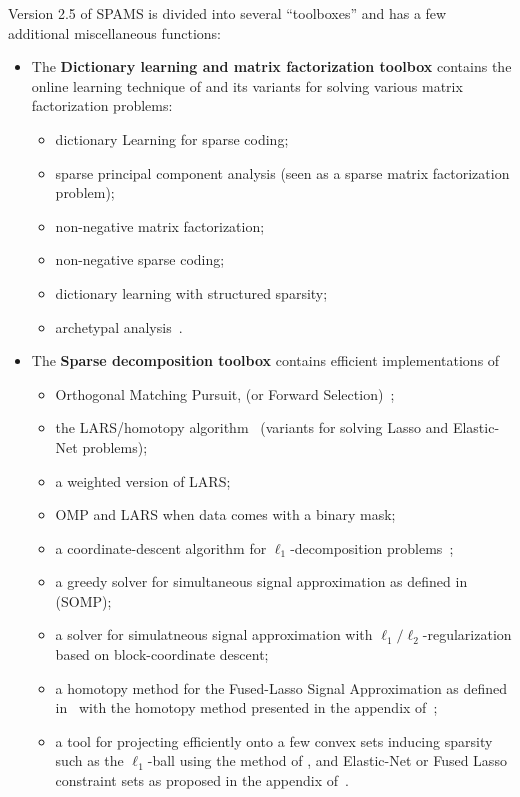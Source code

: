 \documentclass[a4paper, 11pt]{article}
\begin{document}
Version 2.5 of SPAMS is divided into several ``toolboxes'' and has a few
additional miscellaneous functions:
\begin{itemize}
\item The \textbf{Dictionary learning and matrix factorization toolbox}
contains the online learning technique of \cite{mairal7,mairal9} and its
variants for solving various matrix factorization problems:
\begin{itemize}
\item dictionary Learning for sparse coding;
\item sparse principal component analysis (seen as a sparse matrix factorization problem);
\item non-negative matrix factorization;
\item non-negative sparse coding;
\item dictionary learning with structured sparsity;
\item archetypal analysis~\cite{Cut94,ChenCVPR}.
\end{itemize}
\item The \textbf{Sparse decomposition toolbox} contains efficient implementations of
\begin{itemize}
\item Orthogonal Matching Pursuit, (or Forward Selection)~\cite{weisberg,mallat4};
\item the LARS/homotopy algorithm~\cite{osborne,efron} (variants for solving Lasso and Elastic-Net problems);
\item a weighted version of LARS;
\item OMP and LARS when data comes with a binary mask;
\item a coordinate-descent algorithm for $\ell_1$-decomposition problems~\cite{fu,friedman,wu};
\item a greedy solver for simultaneous signal approximation as defined in~\cite{tropp2,tropp3} (SOMP);
\item a solver for simulatneous signal approximation with $\ell_1/\ell_2$-regularization based on block-coordinate descent;
\item a homotopy method for the Fused-Lasso Signal Approximation as defined in~\cite{friedman} with the homotopy method presented in the appendix of~\cite{mairal9};
\item a tool for projecting efficiently onto a few convex sets
inducing sparsity such as the $\ell_1$-ball using the method of
\cite{brucker,maculan,duchi}, and Elastic-Net or Fused Lasso constraint sets as
proposed in the appendix of~\cite{mairal9}.

\end{itemize}
\end{itemize}
\end{document}
